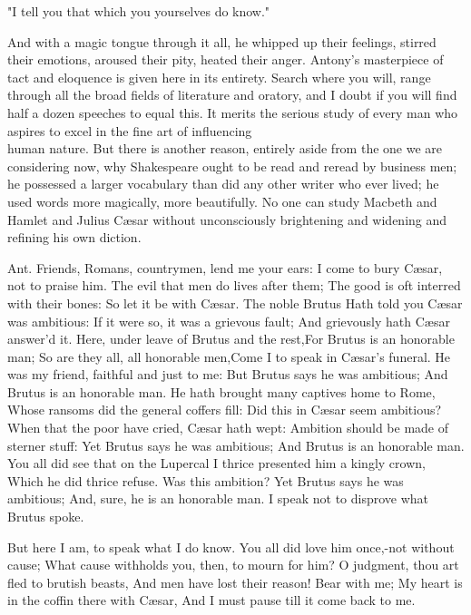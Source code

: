 \documentclass[10pt]{article}
\begin{document}
\begin{displayquote}
"I tell you that which you yourselves do know."
\end{displayquote}

And with a magic tongue through it all, he whipped up their feelings, stirred their emotions, aroused their pity, heated their anger. Antony's masterpiece of tact and eloquence is given here in its entirety. Search where you will, range through all the broad fields of literature and oratory, and I doubt if you will find half a dozen speeches to equal this. It merits the serious study of every man who aspires to excel in the fine art of influencing\\
human nature. But there is another reason, entirely aside from the one we are considering now, why Shakespeare ought to be read and reread by business men; he possessed a larger vocabulary than did any other writer who ever lived; he used words more magically, more beautifully. No one can study Macbeth and Hamlet and Julius Cæsar without unconsciously brightening and widening and refining his own diction.

Ant. Friends, Romans, countrymen, lend me your ears: I come to bury Cæsar, not to praise him. The evil that men do lives after them; The good is oft interred with their bones: So let it be with Cæsar. The noble Brutus Hath told you Cæsar was ambitious: If it were so, it was a grievous fault; And grievously hath Cæsar answer'd it. Here, under leave of Brutus and the rest,For Brutus is an honorable man; So are they all, all honorable men,Come I to speak in Cæsar's funeral. He was my friend, faithful and just to me: But Brutus says he was ambitious; And Brutus is an honorable man. He hath brought many captives home to Rome, Whose ransoms did the general coffers fill: Did this in Cæsar seem ambitious? When that the poor have cried, Cæsar hath wept: Ambition should be made of sterner stuff: Yet Brutus says he was ambitious; And Brutus is an honorable man. You all did see that on the Lupercal I thrice presented him a kingly crown, Which he did thrice refuse. Was this ambition? Yet Brutus says he was ambitious; And, sure, he is an honorable man. I speak not to disprove what Brutus spoke.

But here I am, to speak what I do know. You all did love him once,-not without cause; What cause withholds you, then, to mourn for him? O judgment, thou art fled to brutish beasts, And men have lost their reason! Bear with me; My heart is in the coffin there with Cæsar, And I must pause till it come back to me.
\end{document}
